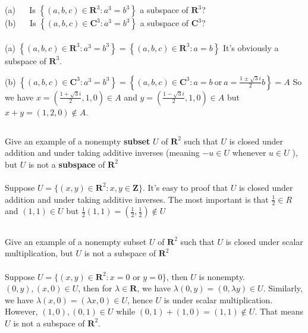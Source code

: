 \documentclass[a4paper]{article}
\begin{document}
\subsection{}
(a) $\quad$ Is $\left\{(a, b, c) \in \mathbf{R}^{3}: a^{3}=b^{3}\right\}$ a subspace of $\mathbf{R}^{3} ?$\\
(b) $\quad$ Is $\left\{(a, b, c) \in \mathbf{C}^{3}: a^{3}=b^{3}\right\}$ a subspace of $\mathbf{C}^{3} ?$
\paragraph{}
(a) $\left\{(a, b, c) \in \mathbf{R}^{3}: a^{3}=b^{3}\right\} = \left\{(a, b, c) \in \mathbf{R}^{3}: a=b\right\}$
It's obviously a subspace of $\mathbf{R}^3$.

(b) $\left\{(a, b, c) \in \mathbf{C}^{3}: a^{3}=b^{3}\right\} = \left\{(a, b, c) \in \mathbf{C}^{3}: a=b\ \text{or}\ a = \frac{1\pm \sqrt{3}i}{2}b\right\} = A$
So we have $ x = (\frac{1+\sqrt{3}i}{2},1,0) \in A $ and $ y = (\frac{1-\sqrt{3}i}{2},1,0) \in A $ but $x + y = (1, 2, 0) \notin A$.

\subsection{}
Give an example of a nonempty \textbf{subset} $U$ of $\mathbf{R}^{2}$ such that $U$ is closed under addition and under taking additive inverses (meaning $-u \in U$ whenever $u \in U$ ), but $U$ is not a \textbf{subspace} of $\mathbf{R}^{2}$
\paragraph{}
Suppose $U = \{(x,y)\in \mathbf{R}^2 : x , y\in \mathbf{Z}\}$. It's easy to proof that $U$ is closed under addition and under taking additive inverses.
The most important is that $\frac{1}{2}\in R$ and $(1,1)\in U$ but $\frac{1}{2}(1,1) = (\frac{1}{2},\frac{1}{2}) \notin U$

\subsection{}
Give an example of a nonempty subset $U$ of $\mathbf{R}^{2}$ such that $U$ is closed under scalar multiplication, but $U$ is not a subspace of $\mathbf{R}^{2}$
\paragraph{}
Suppose $U = \{(x,y)\in \mathbf{R}^2 : x = 0 \text{ or } y = 0\}$, then $U$ is nonempty. $(0,y),(x,0)\in U$, then for $\lambda \in \mathbf{R}$, we have
$\lambda(0,y)=(0,\lambda y)\in U$. Similarly, we have $\lambda(x,0)=(\lambda x,0)\in U$, hence $U$ is under scalar multiplication. However, $(1,0), (0,1)\in U$ while
$(0,1)+(1,0)=(1,1)\notin U$. That means $U$ is not a subspace of $\mathbf{R}^2$.
\end{document}
